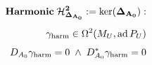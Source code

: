 \documentclass[preview]{standalone}
\begin{document}
\begin{align*}
\special{dvisvgm:raw <g id='unique000'>}\mathbf{Harmonic\;\mathcal{H}_{\Delta_{A_0}}^2 := \ker(\Delta_{A_0}):}\\[5pt]\gamma_{\text{harm}}\in\Omega^2(M_U,\operatorname{ad} P_U)\\[4pt]D_{A_0}\gamma_{\text{harm}}=0 \;\wedge\; D_{A_0}^*\gamma_{\text{harm}}=0\special{dvisvgm:raw </g>}
\end{align*}
\end{document}
